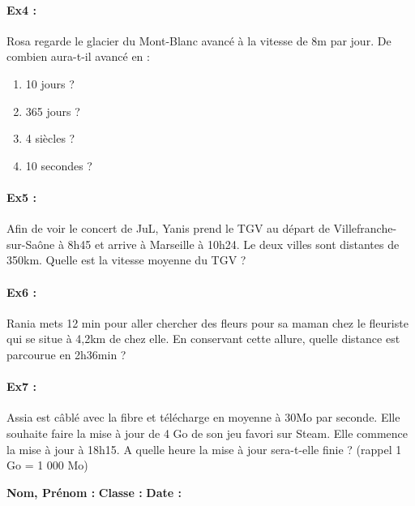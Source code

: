 \paragraph{\textbf{Ex4 : }} Rosa regarde le glacier du Mont-Blanc avancé à la vitesse de 8m par jour. De combien aura-t-il avancé en : 

\begin{multicols}{4}
  \begin{enumerate}
    \item[1.] 10 jours ?
    \item[2.] 365 jours ?
    \item[3.] 4 siècles ?
    \item[4.] 10 secondes ? 
  \end{enumerate}
\end{multicols}

\Pointilles[10]

\newpage

\paragraph{\textbf{Ex5 : }} Afin de voir le concert de JuL, Yanis prend le TGV au départ de Villefranche-sur-Saône à 8h45 et arrive à Marseille à 10h24. Le deux villes sont distantes de 350km. Quelle est la vitesse moyenne du TGV ?

\Pointilles[14]

\paragraph{\textbf{Ex6 : }} Rania mets 12 min pour aller chercher des fleurs pour sa maman chez le fleuriste qui se situe à 4,2km de chez elle. En conservant cette allure, quelle distance est parcourue en 2h36min ?

\Pointilles[14]

\paragraph{\textbf{Ex7 : }} Assia est câblé avec la fibre et télécharge en moyenne à 30Mo par seconde. Elle souhaite faire la mise à jour de 4 Go de son jeu favori sur Steam. Elle commence la mise à jour à 18h15. A quelle heure la mise à jour sera-t-elle finie ? (rappel 1 Go = 1 000 Mo)

\Pointilles[14]

\newpage

\textbf{Nom, Prénom :} \hspace{8cm} \textbf{Classe :} \hspace{3cm} \textbf{Date :}\\

